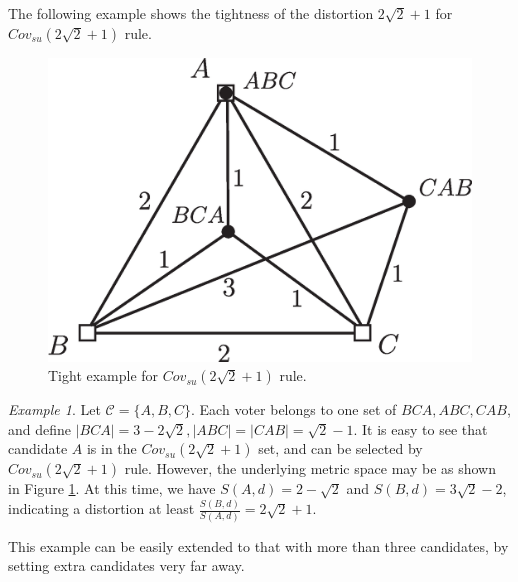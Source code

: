 \documentclass[11pt]{article}
\theoremstyle{remark}
\newtheorem{example}[theorem]{Example}
\begin{document}
The following example shows the tightness of the distortion $2\sqrt2+1$ for $Cov_{su}(2\sqrt2+1)$ rule.
\begin{figure}[htpb]
\begin{center}
\includegraphics[scale=0.3]{a5.eps}
\caption{\label{fig:2} Tight example for $Cov_{su}(2\sqrt2+1)$ rule.}
\end{center}
\end{figure}

\begin{example}
Let $\mathcal C=\{A,B,C\}$. Each voter belongs to one set of $BCA,ABC,CAB$, and define $|BCA|=3-2\sqrt2,|ABC|=|CAB|=\sqrt2-1$. It is easy to see that candidate $A$ is in the $Cov_{su}(2\sqrt2+1)$ set, and can be selected by $Cov_{su}(2\sqrt2+1)$ rule. However, the underlying metric space may be as shown in Figure \ref{fig:2}.
At this time, we have $S(A,d)=2-\sqrt2$ and $S(B,d)=3\sqrt2-2$, indicating a distortion at least $\frac{S(B,d)}{S(A,d)}=2\sqrt2+1$.

This example can be easily extended to that with more than three candidates, by setting extra candidates very far away.
\end{example}

\end{document}
